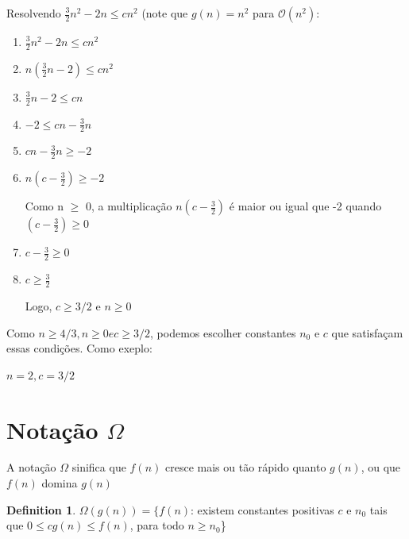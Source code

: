 \documentclass[ a4paper, twocolumn]{article}
\theoremstyle{definition}
\newtheorem{definition}{Definition}[section]
\begin{document}
Resolvendo $\frac{3}{2}n^2 - 2n  \leq cn^2$ (note que $g(n) = n^2$ para $\mathcal{O}(n^2)$:

\begin{enumerate}[Step 1:]
\item $\frac{3}{2}n^2 - 2n \leq cn^2$

\item $n(\frac{3}{2}n - 2) \leq cn^2$

\item $\frac{3}{2}n - 2 \leq cn$

\item $- 2 \leq cn - \frac{3}{2}n$

\item $cn - \frac{3}{2}n \geq -2$

\item $n(c - \frac{3}{2}) \geq -2$

Como n  $\geq$ 0, a multiplicação $n(c - \frac{3}{2})$ é maior ou igual que -2 quando $(c - \frac{3}{2}) \geq 0$

\item $c - \frac{3}{2} \geq 0$

\item $c \geq \frac{3}{2}$

Logo, $c \geq 3/2$ e $n \geq 0$

\end{enumerate}

Como $n \geq 4/3, n \geq 0 e c \geq 3/2$, podemos escolher constantes $n_0$ e $c$ que satisfaçam essas condições. Como exeplo:

$ n = 2, c = 3/2$

\section{Notação $\Omega$}
A notação $\Omega$ sinifica que $f(n)$ cresce mais ou tão rápido quanto $g(n)$, ou que $f(n)$ domina $g(n)$

\begin{definition}
$\Omega (g(n)) = \{f(n)$: existem constantes positivas $c$ e $n_0$ tais que $0 \leq cg(n) \leq f(n)$, para todo $n \geq n_0$\}
\end{definition}
\end{document}

